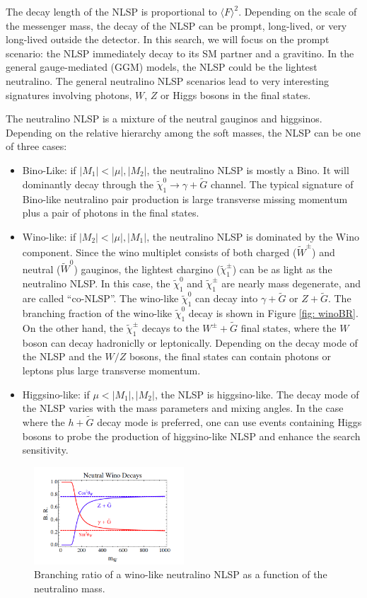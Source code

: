 \documentclass[thesis.tex]{subfiles}
\begin{document}
The decay length of the NLSP is proportional to $\langle F \rangle^2$. 
Depending on the scale of the messenger mass, the decay of the NLSP can be prompt, long-lived, or very long-lived outside the detector. 
In this search, we will focus on the prompt scenario: the NLSP immediately decay to its SM partner and a gravitino. 
In the general gauge-mediated (GGM) models, the NLSP could be the lightest neutralino. 
The general neutralino NLSP scenarios lead to very interesting signatures involving photons, $W$, $Z$ or Higgs bosons in the final states. 

The neutralino NLSP is a mixture of the neutral gauginos and higgsinos. 
Depending on the relative hierarchy among the soft masses, the NLSP can be one of three cases:
\begin{itemize}
	\item Bino-Like: if $|M_1| < |\mu|,|M_2|$, the neutralino NLSP is mostly a Bino. It will dominantly decay through the $\tilde{\chi}_1^0 \rightarrow \gamma + \tilde{G}$ channel. 
	         The typical signature of Bino-like neutralino pair production is large transverse missing momentum plus a pair of photons in the final states.  
	\item Wino-like: if $|M_2| < |\mu|, |M_1|$, the neutralino NLSP is dominated by the Wino component. 
		Since the wino multiplet consists of both charged ($\tilde{W}^\pm$) and neutral ($\tilde{W}^0$) gauginos, the lightest chargino ($\tilde{\chi}_1^\pm$) can be as light as the neutralino NLSP. 
		In this case, the $\tilde{\chi}_1^0$ and $\tilde{\chi}_1^\pm$ are nearly mass degenerate, and are called ``co-NLSP''. 
		The wino-like $\tilde{\chi}_1^0$ can decay into $\gamma + \tilde{G}$ or $Z + \tilde{G}$. 
		The branching fraction of the wino-like $\tilde{\chi}_1^0$ decay is shown in Figure \ref{fig: winoBR}. 
		On the other hand, the $\tilde{\chi}_1^\pm$ decays to the $W^\pm+ \tilde{G}$ final states, where the $W$ boson can decay hadroniclly or leptonically. 
		Depending on the decay mode of the NLSP and the $W/Z$ bosons, the final states can contain photons or leptons plus large transverse momentum. 
	\item Higgsino-like: if $\mu < |M_1|, |M_2|$, the NLSP is higgsino-like. The decay mode of the NLSP varies with the mass parameters and mixing angles. In the case where the $h + \tilde{G}$ decay mode is preferred, one can use events containing Higgs bosons to probe the production of higgsino-like NLSP and enhance the search sensitivity. 
\end{itemize}
	\begin{figure}[!h]
		\centering
		\includegraphics[width=0.5\textwidth]{plot/winoBR.png}
		\caption{Branching ratio of a wino-like neutralino NLSP as a function of the neutralino mass.}
		\label{fig:winoBR}
	\end{figure}
\end{document}

